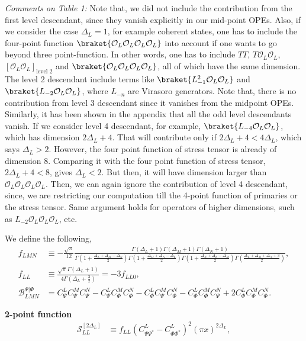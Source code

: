 \documentclass[11pt]{article}
\newcommand{\mO}{\mathcal{O}}
\newcommand{\lb}{\left(}
\newcommand{\rb}{\right)}
\begin{document}
\textit{Comments on Table 1:} Note that, we did not include the contribution from the first level descendant, since they vanish explicitly in our mid-point OPEs. Also, if we consider the case $\Delta_L=1$, for example coherent states, one has to include the four-point function $\braket{\mO_L\mO_L\mO_L\mO_L}$ into account if one wants to go beyond three point-function. In other words, one has to include $TT$, $T\mO_L\mO_L$, $[\mO_L\mO_L]_{\text{level 2}}$ and $\braket{\mO_L\mO_L\mO_L\mO_L}$, all of which have the same dimension. The level 2 descendant include terms like $\braket{L_{-1}^2\mO_L\mO_L}$ and $\braket{L_{-2}\mO_L\mO_L}$, where $L_{-n}$ are Virasoro generators. Note that, there is no contribution from level 3 descendant since it vanishes from the midpoint OPEs. Similarly, it has been shown in the appendix that all the odd level descendants vanish. If we consider level 4 descendant, for example, $\braket{L_{-4}\mO_L\mO_L}$, which has dimension $2\Delta_L+4$. That will contribute only if $2\Delta_L+4 <4\Delta_L$, which says $\Delta_L>2$. However, the four point function of stress tensor is already of dimension 8. Comparing it with the four point function of stress tensor, $2\Delta_L+4<8$, gives $\Delta_L<2$. But then, it will have dimension larger than $\mO_L\mO_L\mO_L\mO_L$. Then, we can again ignore the contribution of level 4 descendant, since, we are restricting our computation till the 4-point function of primaries or the stress tensor. Same argument holds for operators of higher dimensions, such as $L_{-2}\mO_L\mO_L\mO_L$, etc. 

We define the following,
\begin{align}
    f_{LMN}
&\equiv
-\frac{\sqrt{\pi}}{12}
\frac{
\Gamma(\Delta_L+1)
\Gamma(\Delta_M+1)
\Gamma(\Delta_N+1)
}{
\Gamma\lb1+\frac{\Delta_L+\Delta_M-\Delta_N}{2}\rb
\Gamma\lb1+\frac{\Delta_M+\Delta_N-\Delta_L}{2}\rb
\Gamma\lb1+\frac{\Delta_N+\Delta_L-\Delta_M}{2}\rb
\Gamma\lb\frac{\Delta_L+\Delta_M+\Delta_N+3}{2}\rb
},\\
    f_{LL}
    &\equiv
    \frac{\sqrt{\pi}\Gamma(\Delta_L+1)}
    {4\Gamma\lb\Delta_L+\frac32\rb}=-3f_{LL0},\\
\mathcal B_{LMN}^{\Psi|\Phi}
&={}
C_\Psi^LC_\Psi^MC_\Psi^N
-C_\Psi^LC_\Phi^MC_\Phi^N
-C_\Phi^LC_\Psi^MC_\Phi^N
-
C_\Phi^LC_\Phi^MC_\Psi^N
+2C_\Phi^LC_\Phi^MC_\Phi^N .
\end{align}

\textbf{2-point function}
\begin{align}
    \mathcal S_{LL}^{[2\Delta_L]}
    &\equiv
    f_{LL}(C^L_{\Psi\Psi^*}-C^L_{\Phi\Phi^*})^2(\pi x)^{2\Delta_L},
\end{align}
\end{document}
